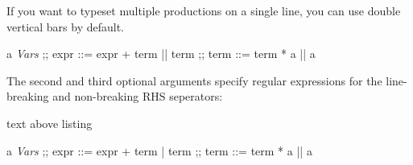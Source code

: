 \documentclass[a4paper]{article}
\begin{document}
If you want to typeset multiple productions on a single line, you can use double vertical bars by default.
\begin{exampleside}
  \begin{bnfgrammar}
    a \in \textit{Vars}
    ;;
    expr ::= expr + term || term
    ;;
    term ::= term * a || a
  \end{bnfgrammar}
\end{exampleside}

The second and third optional arguments specify regular expressions for the line-breaking and non-breaking RHS seperators:
\begin{tcblisting}{text above listing}
  \begin{bnfgrammar}[llcll][\|\|][\|]
    a \in \textit{Vars}
    ;;
    expr ::= expr + term | term
    ;;
    term ::= term * a
    || a
  \end{bnfgrammar}
\end{tcblisting}
\end{document}

